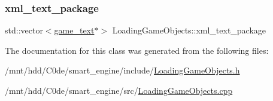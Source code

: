 \mbox{\label{classLoadingGameObjects_a1271d3582b99778a702281510accf07d}} 
\subsubsection{\texorpdfstring{xml\+\_\+text\+\_\+package}{xml\_text\_package}}
{\footnotesize\ttfamily std\+::vector$<$\hyperlink{classgame__text}{game\+\_\+text}$\ast$$>$ Loading\+Game\+Objects\+::xml\+\_\+text\+\_\+package\hspace{0.3cm}{\ttfamily [private]}}



The documentation for this class was generated from the following files\+:\begin{DoxyCompactItemize}
\item 
/mnt/hdd/\+C0de/smart\+\_\+engine/include/\hyperlink{LoadingGameObjects_8h}{Loading\+Game\+Objects.\+h}\item 
/mnt/hdd/\+C0de/smart\+\_\+engine/src/\hyperlink{LoadingGameObjects_8cpp}{Loading\+Game\+Objects.\+cpp}\end{DoxyCompactItemize}
